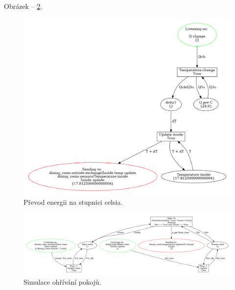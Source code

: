 Obrázek -- \ref{heater-viz}.

\begin{figure}[htb]
 \centering
 \includegraphics[width=\textwidth]{obrazky-figures/room-temp-upd.png}
 \caption{Převod energii na stupnici celsia.}
 \label{room-temp-viz}
\end{figure}

\begin{figure}[htb] %
 \centering
 \includegraphics[width=\textwidth]{obrazky-figures/room-heating.png}
 \caption{Simulace ohřívání pokojů.}
 \label{heater-viz}
\end{figure}

